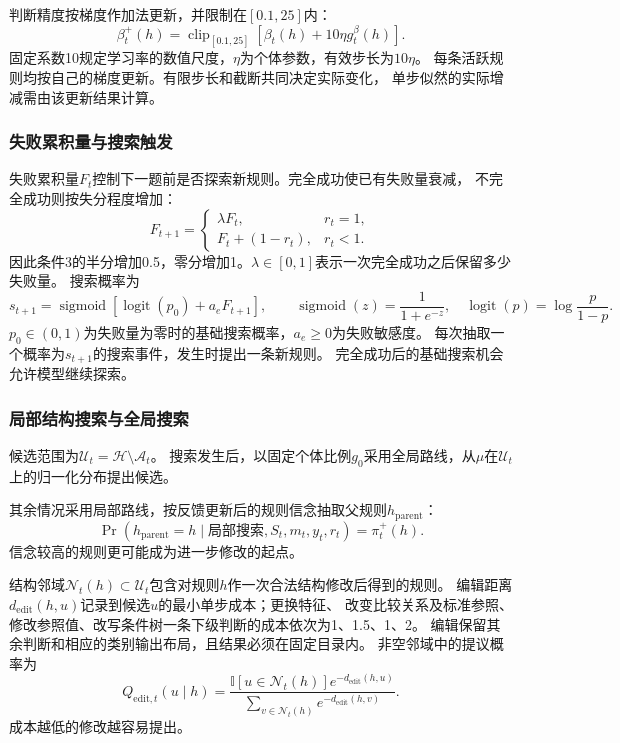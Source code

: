 \documentclass[11pt,a4paper]{article}
\numberwithin{equation}{section}
\newcommand{\ind}{\mathbb{I}}
\newcommand{\clip}{\operatorname{clip}}
\newcommand{\logit}{\operatorname{logit}}
\newcommand{\sigmoid}{\operatorname{sigmoid}}
\newcommand{\A}{\mathcal{A}}
\newcommand{\Hh}{\mathcal{H}}
\begin{document}
判断精度按梯度作加法更新，并限制在$[0.1,25]$内：
\begin{equation}
\beta_t^+(h)=\clip_{[0.1,25]}\left[\beta_t(h)+10\eta g_t^\beta(h)\right].
\label{eq:beta}
\end{equation}
固定系数10规定学习率的数值尺度，$\eta$为个体参数，有效步长为$10\eta$。
每条活跃规则均按自己的梯度更新。有限步长和截断共同决定实际变化，
单步似然的实际增减需由该更新结果计算。

\subsubsection{失败累积量与搜索触发}
失败累积量$F_t$控制下一题前是否探索新规则。完全成功使已有失败量衰减，
不完全成功则按失分程度增加：
\begin{equation}
F_{t+1}=\begin{cases}\lambda F_t,&r_t=1,\\F_t+(1-r_t),&r_t<1.\end{cases}
\label{eq:failure}
\end{equation}
因此条件3的半分增加0.5，零分增加1。$\lambda\in[0,1]$表示一次完全成功之后保留多少失败量。
搜索概率为
\begin{equation}
s_{t+1}=\sigmoid\!\left[\logit(p_0)+a_eF_{t+1}\right],\qquad
\sigmoid(z)=\frac1{1+e^{-z}},\quad\logit(p)=\log\frac{p}{1-p}.
\label{eq:search}
\end{equation}
$p_0\in(0,1)$为失败量为零时的基础搜索概率，$a_e\geq0$为失败敏感度。
每次抽取一个概率为$s_{t+1}$的搜索事件，发生时提出一条新规则。
完全成功后的基础搜索机会允许模型继续探索。

\subsubsection{局部结构搜索与全局搜索}
\label{sec:proposal}
候选范围为$\mathcal U_t=\Hh\setminus\A_t$。
搜索发生后，以固定个体比例$g_0$采用全局路线，从$\mu$在$\mathcal U_t$上的归一化分布提出候选。

其余情况采用局部路线，按反馈更新后的规则信念抽取父规则$h_{\mathrm{parent}}$：
\begin{equation}
\Pr(h_{\mathrm{parent}}=h\mid\text{局部搜索},S_t,m_t,y_t,r_t)=\pi_t^+(h).
\label{eq:parent}
\end{equation}
信念较高的规则更可能成为进一步修改的起点。

结构邻域$\mathcal N_t(h)\subset\mathcal U_t$包含对规则$h$作一次合法结构修改后得到的规则。
编辑距离$d_{\mathrm{edit}}(h,u)$记录到候选$u$的最小单步成本；更换特征、
改变比较关系及标准参照、修改参照值、改写条件树一条下级判断的成本依次为1、1.5、1、2。
编辑保留其余判断和相应的类别输出布局，且结果必须在固定目录内。
非空邻域中的提议概率为
\begin{equation}
Q_{\mathrm{edit},t}(u\mid h)=
\frac{\ind[u\in\mathcal N_t(h)]e^{-d_{\mathrm{edit}}(h,u)}}
{\sum_{v\in\mathcal N_t(h)}e^{-d_{\mathrm{edit}}(h,v)}}.
\end{equation}
成本越低的修改越容易提出。
\end{document}
